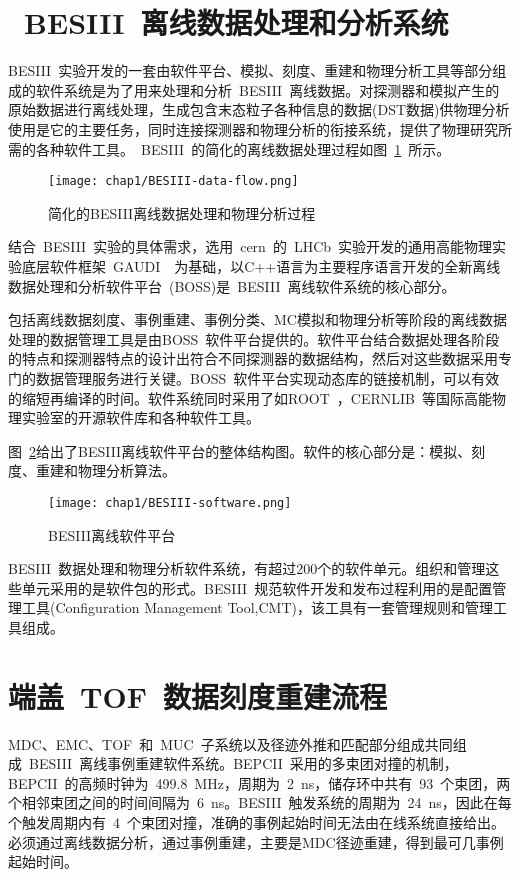 \section{~BESIII~离线数据处理和分析系统}
BESIII~实验开发的一套由软件平台、模拟、刻度、重建和物理分析工具等部分组成的软件系统是为了用来处理和分析~BESIII~离线数据。对探测器和模拟产生的原始数据进行离线处理，生成包含末态粒子各种信息的数据(DST数据)供物理分析使用是它的主要任务，同时连接探测器和物理分析的衔接系统，提供了物理研究所需的各种软件工具。~BESIII~的简化的离线数据处理过程如图~\ref{fig:BESIII-data-flow}~所示。
\begin{figure}[!h]
  \centering
  \texttt{[image: chap1/BESIII-data-flow.png]}
  \caption{简化的BESIII离线数据处理和物理分析过程}
  \label{fig:BESIII-data-flow}
\end{figure}

结合~BESIII~实验的具体需求，选用~cern~的~LHCb~实验开发的通用高能物理实验底层软件框架~GAUDI~~\cite{Barrand:2000}为基础，以C++语言为主要程序语言开发的全新离线数据处理和分析软件平台~\cite{liwd:2006}(BOSS)是~BESIII~离线软件系统的核心部分。

包括离线数据刻度、事例重建、事例分类、MC模拟和物理分析等阶段的离线数据处理的数据管理工具是由BOSS~软件平台提供的。软件平台结合数据处理各阶段的特点和探测器特点的设计出符合不同探测器的数据结构，然后对这些数据采用专门的数据管理服务进行关键。BOSS~软件平台实现动态库的链接机制，可以有效的缩短再编译的时间。软件系统同时采用了如ROOT~\cite{root}，CERNLIB~\cite{cern}等国际高能物理实验室的开源软件库和各种软件工具。

图~\ref{fig:BESIII-software}给出了BESIII离线软件平台的整体结构图。软件的核心部分是：模拟、刻度、重建和物理分析算法。
\begin{figure}[!h]
  \centering
  \texttt{[image: chap1/BESIII-software.png]}
  \caption{BESIII离线软件平台}
  \label{fig:BESIII-software}
\end{figure}

BESIII~数据处理和物理分析软件系统，有超过200个的软件单元。组织和管理这些单元采用的是软件包的形式。BESIII~规范软件开发和发布过程利用的是配置管理工具(Configuration Management Tool,CMT)，该工具有一套管理规则和管理工具组成。%

\section{端盖~TOF~数据刻度重建流程}
MDC、EMC、TOF~和~MUC~子系统以及径迹外推和匹配部分组成共同组成~BESIII~离线事例重建软件系统。BEPCII~采用的多束团对撞的机制，BEPCII~的高频时钟为~499.8~MHz，周期为~2~ns，储存环中共有~93~个束团，两个相邻束团之间的时间间隔为~6~ns。BESIII~触发系统的周期为~24~ns，因此在每个触发周期内有~4~个束团对撞，准确的事例起始时间无法由在线系统直接给出。必须通过离线数据分析，通过事例重建，主要是MDC径迹重建，得到最可几事例起始时间。

